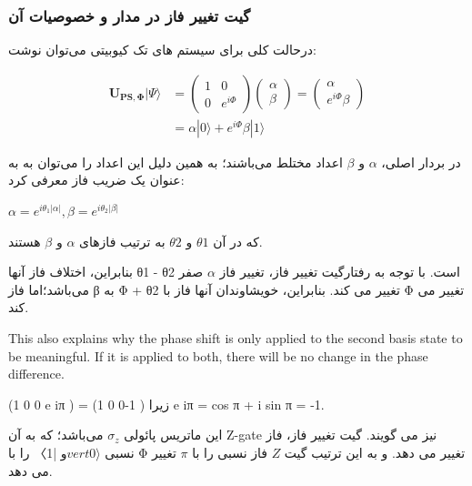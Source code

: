 \documentclass{book}
\begin{document}
\subsubsection{گیت تغییر فاز در مدار و خصوصیات آن}
درحالت کلی برای سیستم های تک کیوبیتی می‌توان نوشت:

\begin{center}
	$$\begin{aligned}
		\boldsymbol{U}_{\boldsymbol{P S}, \boldsymbol{\Phi}}|\Psi\rangle & =\left(\begin{array}{cc}
			1 & 0 \\
			0 & e^{i \Phi}
		\end{array}\right)\left(\begin{array}{l}
			\alpha \\
			\beta
		\end{array}\right)=\left(\begin{array}{c}
			\alpha \\
			e^{i \Phi} \beta
		\end{array}\right) \\
		& =\alpha|0\rangle+e^{i \Phi} \beta|1\rangle
	\end{aligned}$$
\end{center}
در بردار اصلی، $\alpha$ و $\beta$ اعداد مختلط می‌باشند؛ به همین دلیل این اعداد را می‌توان به به عنوان یک ضریب فاز معرفی کرد:

 \begin{center}
 	$\alpha = e^{i\theta_{1} \vert\alpha\vert }, \beta = e^{i\theta_{2} \vert\beta\vert}$
 \end{center}
که در آن $\theta1$ و $\theta2$ به ترتیب فازهای $\alpha$ و $\beta$ هستند.

بنابراین، اختلاف فاز آنها θ1 - θ2 است. با توجه به رفتارگیت تغییر فاز، تغییر فاز $\alpha$ صفر می‌باشد؛‌اما فاز β به Φ + θ2 تغییر می کند. بنابراین، خویشاوندان آنها فاز با Φ تغییر می کند. 

\begin{center}
	 This also explains why the phase shift is only applied to the
	second basis state to be meaningful. If it is applied to both, there will be no change
	in the phase difference.
\end{center}

 (1 0
0 e iπ
)
=
(1 0
0-1
)
زیرا e iπ = cos π + i sin π = -1.



 این ماتریس پائولی $ \sigma_{z}$ می‌باشد؛ که به آن Z-gate نیز می گویند. گیت تغییر فاز، فاز نسبی $vert 0 \rangle$و |1〉 را با Φ تغییر می دهد. و به این ترتیب گیت $Z$ فاز نسبی را با $\pi$ تغییر می دهد. 
 
\end{document}
